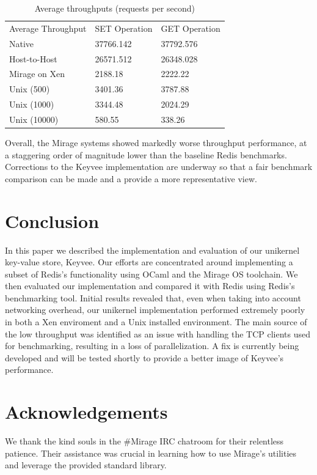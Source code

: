 \documentclass[english,10pt,twocolumn]{article}
\begin{document}
\begin{table}[h]
\begin{tabular}{lll}
Average Throughput & SET Operation & GET Operation \\
Native & 37766.142 & 37792.576 \\
Host-to-Host & 26571.512 & 26348.028 \\
Mirage on Xen & 2188.18 & 2222.22 \\
Unix (500) & 3401.36 & 3787.88 \\
Unix (1000) & 3344.48 & 2024.29 \\
Unix (10000) & 580.55 & 338.26
\end{tabular}
\caption{Average throughputs (requests per second)}
\label{my-label}
\end{table}

Overall, the Mirage systems showed markedly worse throughput performance, at a staggering order of magnitude lower than the baseline Redis benchmarks.
Corrections to the Keyvee implementation are underway so that a fair benchmark comparison can be made and a provide a more representative view.

\section{Conclusion}
In this paper we described the implementation and evaluation of our unikernel key-value store, Keyvee.
Our efforts are concentrated around implementing a subset of Redis's functionality using OCaml and the Mirage OS toolchain.
We then evaluated our implementation and compared it with Redis using Redis's benchmarking tool.
Initial results revealed that, even when taking into account networking overhead, our unikernel implementation performed extremely poorly in both a Xen enviroment and a Unix installed environment.
The main source of the low throughput was identified as an issue with handling the TCP clients used for benchmarking, resulting in a loss of parallelization.
A fix is currently being developed and will be tested shortly to provide a better image of Keyvee's performance.


\section{Acknowledgements}
We thank the kind souls in the \#Mirage IRC chatroom for their relentless patience.
Their assistance was crucial in learning how to use Mirage's utilities and leverage the provided standard library.





\end{document}
